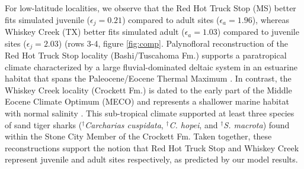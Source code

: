 \documentclass[]{rsos}%
\begin{document}




For low-latitude localities, we observe that the Red Hot Truck Stop (MS) better fits simulated juvenile ($\epsilon_j = 0.21$) compared to adult sites ($\epsilon_a = 1.96$), whereas Whiskey Creek (TX) better fits simulated adult ($\epsilon_a = 1.03$) compared to juvenile sites ($\epsilon_j = 2.03$) (rows 3-4, figure \ref{fig:comp}.
Palynofloral reconstruction of the Red Hot Truck Stop locality (Bashi/Tuscahoma Fm.) supports a paratropical climate \cite{Harrington2003} characterized by a large fluvial-dominated deltaic system in an estuarine habitat that spans the Paleocene/Eocene Thermal Maximum \cite{ingram1991tuscahoma, beard2008oldest, Beard2009}. 
In contrast, the Whiskey Creek locality (Crockett Fm.) is dated to the early part of the Middle Eocene Climate Optimum (MECO)\cite{Flis2017} and represents a shallower marine habitat with normal salinity \cite{Breard1999, harding2014mineralogy}. 
This sub-tropical climate supported at least three species of sand tiger sharks (${}^\dag$\emph{Carcharias cuspidata}, ${}^\dag$\emph{C. hopei}, and ${}^\dag$\emph{S. macrota}) \cite{Breard1999, Westgate} found within the Stone City Member of the Crockett Fm.
Taken together, these reconstructions support the notion that Red Hot Truck Stop and Whiskey Creek represent juvenile and adult sites respectively, as predicted by our model results. 

\end{document}
